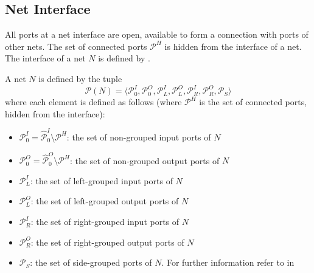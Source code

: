 \subsection{Net Interface}
\label{sect_smx_nets_interface}
All ports at a net interface are open, \ie available to form a connection with ports of other nets.
The set of connected ports $\mathcal{P}^H$ is hidden from the interface of a net.
The interface of a net $N$ is defined by \Def{\ref{def_smx_net}}.
\begin{definition}
    \label{def_smx_net}
    A net $N$ is defined by the tuple
    $$\mathcal{P}(N) = \langle \mathcal{P}_0^I, \mathcal{P}_0^O, \mathcal{P}_L^I, \mathcal{P}_L^O, \mathcal{P}_R^I, \mathcal{P}_R^O, \mathcal{P}_S \rangle$$
    where each element is defined as follows (where $\mathcal{P}^H$ is the set of connected ports, hidden from the interface):
    \begin{itemize}
        \item $\mathcal{P}_0^I = \hat{\mathcal{P}}_0^{I} \setminus \mathcal{P}^H$: the set of non-grouped input ports of $N$
        \item $\mathcal{P}_0^O = \hat{\mathcal{P}}_0^{O} \setminus \mathcal{P}^H$: the set of non-grouped output ports of $N$
        \item $\mathcal{P}_L^I$: the set of left-grouped input ports of $N$
        \item $\mathcal{P}_L^O$: the set of left-grouped output ports of $N$
        \item $\mathcal{P}_R^I$: the set of right-grouped input ports of $N$
        \item $\mathcal{P}_R^O$: the set of right-grouped output ports of $N$
        \item $\mathcal{P}_S$: the set of side-grouped ports of $N$. For further information refer to \Def{\ref{def_smx_side}} in \Sect{\ref{sect_smx_nets_side}}
    \end{itemize}
\end{definition}

